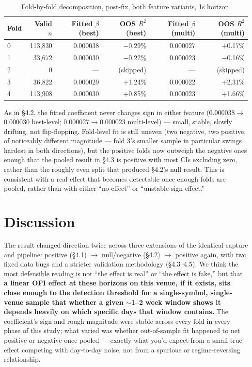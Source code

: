 \documentclass[11pt]{article}
\begin{document}
\begin{table}[h]
\centering
\begin{tabular}{lrrrrr}
\toprule
Fold & Valid $n$ & Fitted $\beta$ (best) & OOS $R^2$ (best) & Fitted $\beta$ (multi) & OOS $R^2$ (multi) \\
\midrule
0 & 113{,}830 & 0.000038 & $-$0.29\% & 0.000027 & +0.17\% \\
1 & 33{,}672 & 0.000030 & $-$0.22\% & 0.000023 & $-$0.16\% \\
2 & 0 & --- & (skipped) & --- & (skipped) \\
3 & 36{,}822 & 0.000029 & +1.24\% & 0.000022 & +2.31\% \\
4 & 113{,}908 & 0.000030 & +0.85\% & 0.000023 & +1.66\% \\
\bottomrule
\end{tabular}
\caption{Fold-by-fold decomposition, post-fix, both feature variants, 1s horizon.}
\end{table}

As in \S4.2, the fitted coefficient never changes sign in either feature (0.000038$\to$0.000030 best-level; 0.000027$\to$0.000023 multi-level) --- small, stable, slowly drifting, not flip-flopping. Fold-level fit is still uneven (two negative, two positive, of noticeably different magnitude --- fold 3's smaller sample in particular swings hardest in both directions), but the positive folds now outweigh the negative ones enough that the pooled result in \S4.3 is positive with most CIs excluding zero, rather than the roughly even split that produced \S4.2's null result. This is consistent with a real effect that becomes detectable once enough folds are pooled, rather than with either ``no effect'' or ``unstable-sign effect.''

\section{Discussion}

The result changed direction twice across three extensions of the identical capture and pipeline: positive (\S4.1) $\to$ null/negative (\S4.2) $\to$ positive again, with two fixed data bugs and a stricter validation methodology (\S4.3--4.5). We think the most defensible reading is not ``the effect is real'' or ``the effect is fake,'' but that \textbf{a linear OFI effect at these horizons on this venue, if it exists, sits close enough to the detection threshold for a single-symbol, single-venue sample that whether a given $\sim$1--2 week window shows it depends heavily on which specific days that window contains.} The coefficient's sign and rough magnitude were stable across every fold in every phase of this study; what varied was whether out-of-sample fit happened to net positive or negative once pooled --- exactly what you'd expect from a small true effect competing with day-to-day noise, not from a spurious or regime-reversing relationship.
\end{document}
